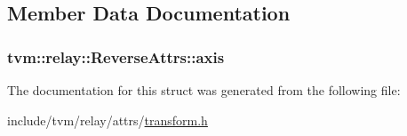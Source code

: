 \subsection{Member Data Documentation}
\subsubsection[{\texorpdfstring{axis}{axis}}]{ tvm\+::relay\+::\+Reverse\+Attrs\+::axis}\hypertarget{structtvm_1_1relay_1_1ReverseAttrs_a0fe0a352985941489400e211799f1b8a}{}\label{structtvm_1_1relay_1_1ReverseAttrs_a0fe0a352985941489400e211799f1b8a}


The documentation for this struct was generated from the following file\+:\begin{DoxyCompactItemize}
\item 
include/tvm/relay/attrs/\hyperlink{include_2tvm_2relay_2attrs_2transform_8h}{transform.\+h}\end{DoxyCompactItemize}
